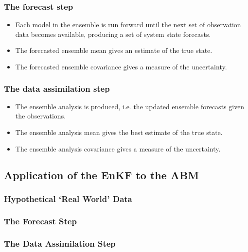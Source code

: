 \subsubsection{The forecast step}
\label{methods:enkf:forecast}

\begin{itemize}
    \item Each model in the ensemble is run forward until the next set of observation data becomes available, producing a set of system state forecasts.
    \item The forecasted ensemble mean gives an estimate of the true state.
    \item The forecasted ensemble covariance gives a measure of the uncertainty.
\end{itemize}

\subsubsection{The data assimilation step}
\label{methods:enkf:assimilation}

\begin{itemize}
    \item The ensemble analysis is produced, i.e. the updated ensemble forecasts given the observations.
    \item The ensemble analysis mean gives the best estimate of the true state.
    \item The ensemble analysis covariance gives a measure of the uncertainty.
\end{itemize}

\subsection{Application of the EnKF to the ABM}
\label{malleson:methods:application}

\subsubsection{Hypothetical `Real World' Data}
\label{methods:application:data}

\subsubsection{The Forecast Step}
\label{methods:application:forecast}

\subsubsection{The Data Assimilation Step}
\label{methods:applicaiton:assimilation}

